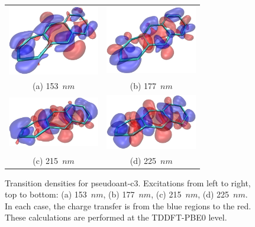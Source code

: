 \documentclass[aip,reprint,nofootinbib]{revtex4-1}
\begin{document}
\begin{figure}
\begin{tabular}{cc}
\includegraphics[width=4cm]{psc3-pk1} &
\includegraphics[width=4cm]{psc3-pk2} \\
(a) 153~$nm$ & (b) 177~$nm$ \\
\includegraphics[width=4cm]{psc3-pk3} &
\includegraphics[width=4cm]{psc3-pk4} \\
(c) 215~$nm$ & (d) 225~$nm$ \\
\end{tabular}
\caption[Transition densities for pseudotwistacene.]{Transition densities for pseudoant-c3. Excitations from left to right, top to bottom: (a) 153~$nm$, (b) 177~$nm$, (c) 215~$nm$, (d) 225~$nm$. In each case, the charge transfer is from the blue regions to the red. These calculations are performed at the TDDFT-PBE0 level.}\label{fig:pstwistapeaks}
\end{figure}
\end{document}
